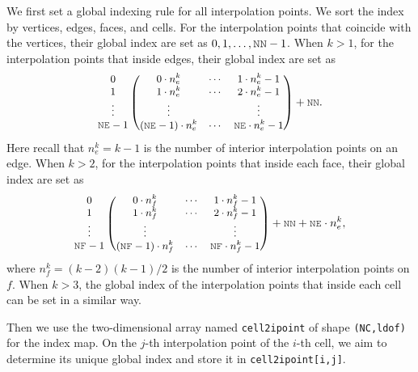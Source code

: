\documentclass[mathpazo]{cicp}
\begin{document}
We first set a global indexing rule for all interpolation points. We sort the index by vertices, edges, faces, and cells. For the
interpolation points that coincide with the vertices, their global index are set
as $0, 1, \ldots, \mc{NN}-1$.  When $k > 1$,  for the interpolation points that
inside edges, their global index are set as 
$$
\small
\begin{matrix}
 0\\
 1\\
 \vdots\\
 \mc{NE}-1
\end{matrix}
\begin{pmatrix}
0\cdot n_e^k &  \cdots & 1\cdot n_e^k-1\\
1\cdot n_e^k &  \cdots & 2\cdot n_e^k-1\\
 \vdots &  & \vdots \\
(\mc{NE}-1)\cdot n_e^k & \cdots & \mc{NE}\cdot n_e^k - 1\\
\end{pmatrix} +  \mc{NN}.
$$
Here recall that $n_e^k = k-1$ is the number of interior interpolation points on an edge. 
When $k>2$, for the interpolation points that inside each face, their global
index are set as  
$$
\small
\begin{matrix}
 0\\
 1\\
 \vdots\\
 \mc{NF}-1
\end{matrix}
\begin{pmatrix}
0\cdot n_f^k &  \cdots & 1\cdot n_f^k-1\\
1\cdot n_f^k &  \cdots & 2\cdot n_f^k-1\\
\vdots &  & \vdots \\
(\mc{NF}-1)\cdot n_f^k & \cdots & \mc{NF}\cdot n_f^k - 1\\
\end{pmatrix} + \mc{NN} + \mc{NE}\cdot n_e^k,
$$
where $n_f^k = (k-2)(k-1)/2$ is the number of interior interpolation points on $f$. 
When $k>3$, the global index of the interpolation points that inside
each cell can be set in a similar way. 

Then we use the two-dimensional array named \lstinline{cell2ipoint} of shape
\lstinline{(NC,ldof)} for the index map. On the $j$-th interpolation
point of the $i$-th cell, we aim to determine its unique global index and store
it in \lstinline{cell2ipoint[i,j]}.

\end{document}
